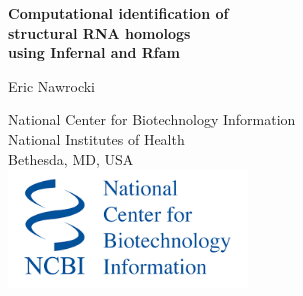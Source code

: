 \documentclass[landscape]{slides}
\begin{document}
\begin{slide}
\begin{center}
\large{\textbf{Computational identification of \\ structural RNA homologs \\
using Infernal and Rfam}}

\normalsize

Eric Nawrocki

National Center for Biotechnology Information\\
National Institutes of Health\\
Bethesda, MD, USA\\

\vspace{1in}
\includegraphics[width=2.5in]{figs/ncbi-logo}


\medskip

\medskip

\small



\end{center}
\end{slide}
\end{document}
